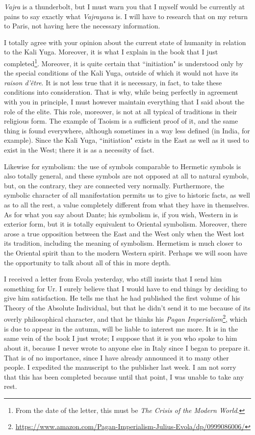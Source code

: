 \emph{Vajra} is a thunderbolt, but I must warn you that I myself would be currently at pains to say exactly what \emph{Vajrayana} is. I will have to research that on my return to Paris, not having here the necessary information.

I totally agree with your opinion about the current state of humanity in relation to the Kali Yuga. Moreover, it is what I explain in the book that I just completed\footnote{From the date of the letter, this must be \emph{The Crisis of the Modern World}.}. Moreover, it is quite certain that ``initiation" is understood only by the special conditions of the Kali Yuga, outside of which it would not have its \emph{raison d'être}. It is not less true that it is necessary, in fact, to take these conditions into consideration. That is why, while being perfectly in agreement with you in principle, I must however maintain everything that I said about the role of the elite. This role, moreover, is not at all typical of traditions in their religious form. The example of Taoism is a sufficient proof of it, and the same thing is found everywhere, although sometimes in a way less defined (in India, for example). Since the Kali Yuga, ``initiation" exists in the East as well as it used to exist in the West; there it is as a necessity of fact.

Likewise for symbolism: the use of symbols comparable to Hermetic symbols is also totally general, and these symbols are not opposed at all to natural symbols, but, on the contrary, they are connected very normally. Furthermore, the symbolic character of all manifestation permits us to give to historic facts, as well as to all the rest, a value completely different from what they have in themselves. As for what you say about Dante; his symbolism is, if you wish, Western in is exterior form, but it is totally equivalent to Oriental symbolism. Moreover, there arose a true opposition between the East and the West only when the West lost its tradition, including the meaning of symbolism. Hermetism is much closer to the Oriental spirit than to the modern Western spirit. Perhaps we will soon have the opportunity to talk about all of this in more depth.

I received a letter from Evola yesterday, who still insists that I send him something for Ur. I surely believe that I would have to end things by deciding to give him satisfaction. He tells me that he had published the first volume of his Theory of the Absolute Individual, but that he didn't send it to me because of its overly philosophical character, and that he thinks his \textit{Pagan Imperialism}\footnote{\url{https://www.amazon.com/Pagan-Imperialism-Julius-Evola/dp/0999086006/}}, which is due to appear in the autumn, will be liable to interest me more. It is in the same vein of the book I just wrote; I suppose that it is you who spoke to him about it, because I never wrote to anyone else in Italy since I began to prepare it. That is of no importance, since I have already announced it to many other people. I expedited the manuscript to the publisher last week. I am not sorry that this has been completed because until that point, I was unable to take any rest.

